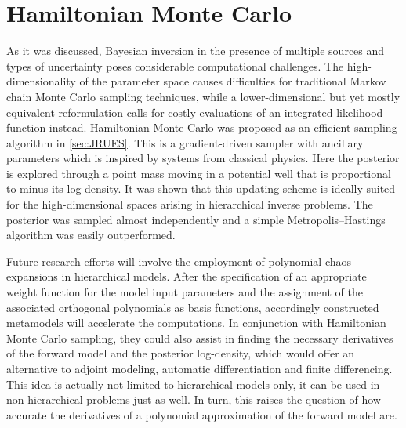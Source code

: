 \section{Hamiltonian Monte Carlo}
As it was discussed, Bayesian inversion in the presence of multiple sources and types of uncertainty poses considerable computational challenges.
The high-dimensionality of the parameter space causes difficulties for traditional Markov chain Monte Carlo sampling techniques,
while a lower-dimensional but yet mostly equivalent reformulation calls for costly evaluations of an integrated likelihood function instead.
Hamiltonian Monte Carlo was proposed as an efficient sampling algorithm in \cref{sec:JRUES}.
This is a gradient-driven sampler with ancillary parameters which is inspired by systems from classical physics.
Here the posterior is explored through a point mass moving in a potential well that is proportional to minus its log-density.
It was shown that this updating scheme is ideally suited for the high-dimensional spaces arising in hierarchical inverse problems.
The posterior was sampled almost independently and a simple Metropolis--Hastings algorithm was easily outperformed.
\par %
Future research efforts will involve the employment of polynomial chaos expansions in hierarchical models.
After the specification of an appropriate weight function for the model input parameters and the assignment of the associated orthogonal polynomials as basis functions,
accordingly constructed metamodels will accelerate the computations.
In conjunction with Hamiltonian Monte Carlo sampling, they could also assist in finding the necessary derivatives of the forward model and the posterior log-density,
which would offer an alternative to adjoint modeling, automatic differentiation and finite differencing.
This idea is actually not limited to hierarchical models only, it can be used in non-hierarchical problems just as well.
In turn, this raises the question of how accurate the derivatives of a polynomial approximation of the forward model are.


